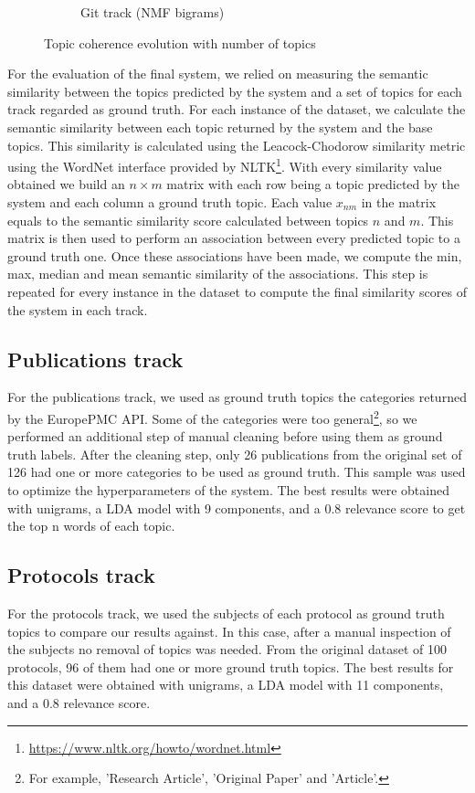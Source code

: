 \documentclass[runningheads]{llncs}
\begin{document}
\begin{figure}
\begin{subfigure}[b]{0.45\textwidth}
		\caption{Git track (NMF bigrams)}
	\end{subfigure}
	\caption{Topic coherence evolution with number of topics}
	\label{coherence_tracks}
\end{figure}

For the evaluation of the final system, we relied on measuring the semantic similarity between the topics predicted by the system and a set of topics for each track regarded as ground truth. For each instance of the dataset, we calculate the semantic similarity between each topic returned by the system and the base topics. This similarity is calculated using the Leacock-Chodorow similarity metric \cite{budanitsky2001semantic} using the WordNet interface provided by NLTK\footnote{\url{https://www.nltk.org/howto/wordnet.html}}. With every similarity value obtained we build an $n \times m$ matrix with each row being a topic predicted by the system and each column a ground truth topic. Each value $x_{nm}$ in the matrix equals to the semantic similarity score calculated between topics $n$ and $m$. This matrix is then used to perform an association between every predicted topic to a ground truth one. Once these associations have been made, we compute the min, max, median and mean semantic similarity of the associations. This step is repeated for every instance in the dataset to compute the final similarity scores of the system in each track.

\subsection{Publications track}
For the publications track, we used as ground truth topics the categories returned by the EuropePMC API. Some of the categories were too general\footnote{For example, 'Research Article', 'Original Paper' and 'Article'.}, so we performed an additional step of manual cleaning before using them as ground truth labels. After the cleaning step, only 26 publications from the original set of 126 had one or more categories to be used as ground truth. This sample was used to optimize the hyperparameters of the system. The best results were obtained with unigrams, a LDA model with 9 components, and a 0.8 relevance score to get the top n words of each topic.

\subsection{Protocols track}
For the protocols track, we used the subjects of each protocol as ground truth topics to compare our results against. In this case, after a manual inspection of the subjects no removal of topics was needed. From the original dataset of 100 protocols, 96 of them had one or more ground truth topics.  The best results for this dataset were obtained with unigrams, a LDA model with 11 components, and a 0.8 relevance score.
\end{document}
